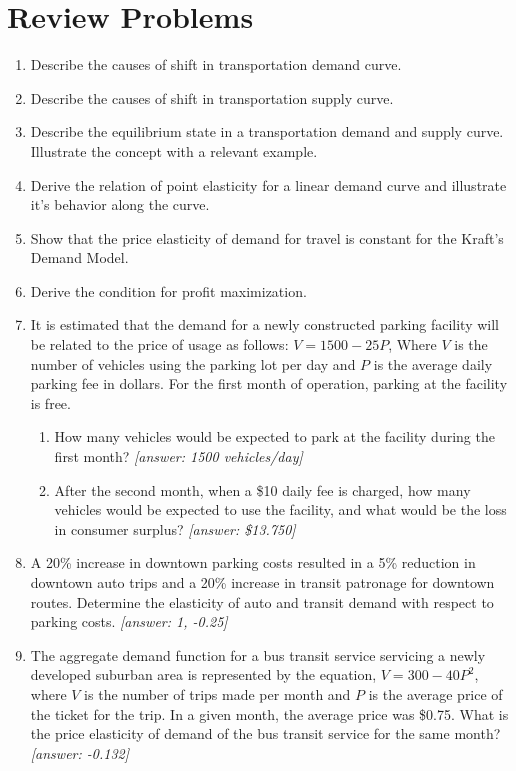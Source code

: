 \section{Review Problems}
\begin{enumerate}
	\item Describe the causes of shift in transportation demand curve.
	\item Describe the causes of shift in transportation supply curve.
	\item Describe the equilibrium state in a transportation demand and supply curve. Illustrate the concept with a relevant example.
	\item Derive the relation of point elasticity for a linear demand curve and illustrate it's behavior along the curve.
	\item Show that the price elasticity of demand for travel is constant for the Kraft's Demand Model.
	\item Derive the condition for profit maximization.
	\item It is estimated that the demand for a newly constructed parking facility will be related to the price of usage as follows: $ V = 1500 - 25 P $, Where $ V $ is the number of vehicles using the parking lot per day and $ P $ is the average daily parking fee in dollars. For the first month of operation, parking at the facility is free.
		\begin{enumerate}
			\item How many vehicles would be expected to park at the facility during the first month? \textit{[answer: 1500 vehicles/day]}
			\item After the second month, when a \$10 daily fee is charged, how many vehicles would be expected to use the facility, and what would be the loss in consumer surplus? \textit{[answer: \$13.750]}
		\end{enumerate}
	\item A 20\% increase in downtown parking costs resulted in a 5\% reduction in downtown auto trips and a 20\% increase in transit patronage for downtown routes. Determine the elasticity of auto and transit demand with respect to parking costs. \textit{[answer: 1, -0.25]}
	\item The aggregate demand function for a bus transit service servicing a newly developed suburban area is represented by the equation, $ V = 300 - 40 P^2 $, where $ V $ is the number of trips made per month and $ P $ is the average price of the ticket for the trip. In a given month, the average price was \$0.75. What is the price elasticity of demand of the bus transit service for the same month? \textit{[answer: -0.132]}
\end{enumerate}


